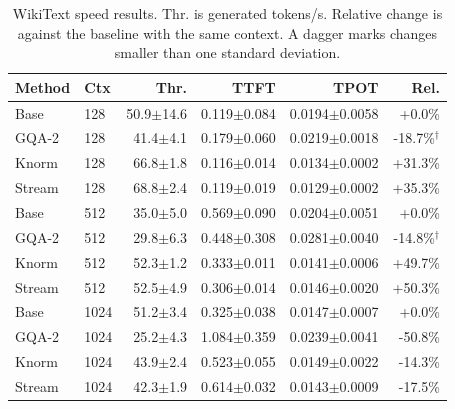 \documentclass{article}
\begin{document}
\begin{table}[!htbp]
  \caption{WikiText speed results. Thr. is generated tokens/s. Relative change is against the baseline with the same context. A dagger marks changes smaller than one standard deviation.}
  \label{tab:speed_wt}
  \centering
  \small
  \setlength{\tabcolsep}{3pt}
  \begin{tabular}{llrrrr}
    \toprule
    Method & Ctx & Thr. & TTFT & TPOT & Rel. \\
    \midrule
    Base & 128 & 50.9$\pm$14.6 & 0.119$\pm$0.084 & 0.0194$\pm$0.0058 & +0.0\% \\
    GQA-2 & 128 & 41.4$\pm$4.1 & 0.179$\pm$0.060 & 0.0219$\pm$0.0018 & -18.7\%$^\dagger$ \\
    Knorm & 128 & 66.8$\pm$1.8 & 0.116$\pm$0.014 & 0.0134$\pm$0.0002 & +31.3\% \\
    Stream & 128 & 68.8$\pm$2.4 & 0.119$\pm$0.019 & 0.0129$\pm$0.0002 & +35.3\% \\
    Base & 512 & 35.0$\pm$5.0 & 0.569$\pm$0.090 & 0.0204$\pm$0.0051 & +0.0\% \\
    GQA-2 & 512 & 29.8$\pm$6.3 & 0.448$\pm$0.308 & 0.0281$\pm$0.0040 & -14.8\%$^\dagger$ \\
    Knorm & 512 & 52.3$\pm$1.2 & 0.333$\pm$0.011 & 0.0141$\pm$0.0006 & +49.7\% \\
    Stream & 512 & 52.5$\pm$4.9 & 0.306$\pm$0.014 & 0.0146$\pm$0.0020 & +50.3\% \\
    Base & 1024 & 51.2$\pm$3.4 & 0.325$\pm$0.038 & 0.0147$\pm$0.0007 & +0.0\% \\
    GQA-2 & 1024 & 25.2$\pm$4.3 & 1.084$\pm$0.359 & 0.0239$\pm$0.0041 & -50.8\% \\
    Knorm & 1024 & 43.9$\pm$2.4 & 0.523$\pm$0.055 & 0.0149$\pm$0.0022 & -14.3\% \\
    Stream & 1024 & 42.3$\pm$1.9 & 0.614$\pm$0.032 & 0.0143$\pm$0.0009 & -17.5\% \\
    \bottomrule
  \end{tabular}
\end{table}
\end{document}
